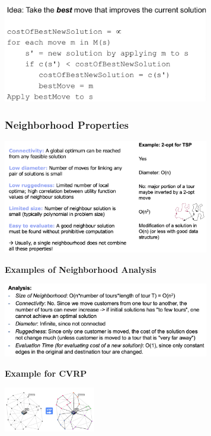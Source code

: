 \documentclass[10pt,a4paper,twocolumn]{article}
\begin{document}
\begin{center}
\includegraphics[width=9cm]{images/best-improving}
\end{center}


\subsubsection{Neighborhood Properties}

\begin{center}
\includegraphics[width=9cm]{images/neighborhood-properties}
\end{center}

\textbf{Examples of Neighborhood Analysis}
\begin{center}
\includegraphics[width=9cm]{images/analysis-neighborhood}
\end{center}

\textbf{Example for CVRP}
\begin{center}
\includegraphics[width=4cm]{images/cvrp}
\end{center}
\end{document}
